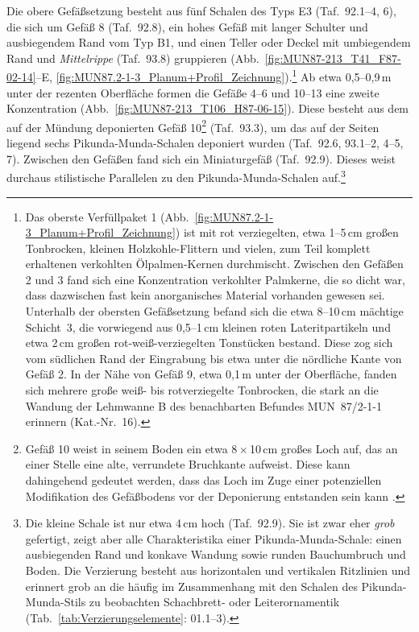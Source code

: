 Die obere Gefäßsetzung besteht aus fünf Schalen des Typs E3 (Taf.~92.1--4, 6), die sich um Gefäß 8 (Taf.~92.8), ein hohes Gefäß mit langer Schulter und ausbiegendem Rand vom Typ B1, und einen Teller oder Deckel mit umbiegendem Rand und \textit{Mittelrippe} (Taf.~93.8) gruppieren (Abb.~\ref{fig:MUN87-213_T41_F87-02-14}--E, \ref{fig:MUN87.2-1-3_Planum+Profil_Zeichnung}).\footnote{Das oberste Verfüllpaket 1 (Abb.~\ref{fig:MUN87.2-1-3_Planum+Profil_Zeichnung}) ist mit rot verziegelten, etwa 1--5\,cm großen Tonbrocken, kleinen Holzkohle-Flittern und vielen, zum Teil komplett erhaltenen verkohlten Ölpalmen-Kernen durchmischt. Zwischen den Gefäßen 2 und 3 fand sich eine Konzentration verkohlter Palmkerne, die so dicht war, dass dazwischen fast kein anorganisches Material vorhanden gewesen sei. Unterhalb der obersten Gefäßsetzung befand sich die etwa 8--10\,cm mächtige Schicht~3, die vorwiegend aus 0,5--1\,cm kleinen roten Lateritpartikeln und etwa 2\,cm großen rot-weiß-verziegelten Tonstücken bestand. Diese zog sich vom südlichen Rand der Eingrabung bis etwa unter die nördliche Kante von Gefäß 2. In der Nähe von Gefäß 9, etwa 0,1\,m unter der Oberfläche, fanden sich mehrere große weiß- bis rotverziegelte Tonbrocken, die stark an die Wandung der Lehmwanne B des benachbarten Befundes MUN~87/2-1-1 erinnern (Kat.-Nr.~16).} Ab etwa 0,5--0,9\,m unter der rezenten Oberfläche formen die Gefäße 4--6 und 10--13 eine zweite Konzentration (Abb.~\ref{fig:MUN87-213_T106_H87-06-15}). Diese besteht aus dem auf der Mündung deponierten Gefäß 10\footnote{Gefäß 10 weist in seinem Boden ein etwa 8\,$\times$\,10\,cm großes Loch auf, das an einer Stelle eine alte, verrundete Bruchkante aufweist. Diese kann dahingehend gedeutet werden, dass das Loch im Zuge einer potenziellen Modifikation des Gefäßbodens vor der Deponierung entstanden sein kann \parencite[siehe][]{Wotzka.1993}.} (Taf.~93.3), um das auf der Seiten liegend sechs Pikunda-Munda-Schalen deponiert wurden (Taf.~92.6, 93.1--2, 4--5, 7). Zwischen den Gefäßen fand sich ein Miniaturgefäß (Taf.~92.9). Dieses weist durchaus stilistische Parallelen zu den Pikunda-Munda-Schalen auf.\footnote{Die kleine Schale ist nur etwa 4\,cm hoch (Taf.~92.9). Sie ist zwar eher \textit{grob} gefertigt, zeigt aber alle Charakteristika einer Pikunda-Munda-Schale: einen ausbiegenden Rand und konkave Wandung sowie runden Bauchumbruch und Boden. Die Verzierung besteht aus horizontalen und vertikalen Ritzlinien und erinnert grob an die häufig im Zusammenhang mit den Schalen des Pikunda-Munda-Stils zu beobachten Schachbrett- oder Leiterornamentik (Tab.~\ref{tab:Verzierungselemente}: 01.1--3).}

